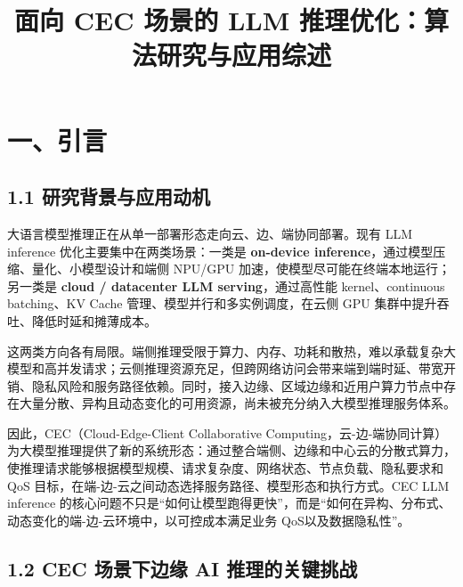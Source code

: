 \documentclass[a4paper,10pt]{ctexart}
\title{面向 CEC 场景的 LLM 推理优化：算法研究与应用综述}
\author{}
\date{}
\begin{document}
\maketitle
\tableofcontents
\vspace{0.8em}


\section*{一、引言}

\subsection*{1.1 研究背景与应用动机}

大语言模型推理正在从单一部署形态走向云、边、端协同部署。现有 LLM inference 优化主要集中在两类场景：一类是 \textbf{on-device inference}，通过模型压缩、量化、小模型设计和端侧 NPU/GPU 加速，使模型尽可能在终端本地运行；另一类是 \textbf{cloud / datacenter LLM serving}，通过高性能 kernel、continuous batching、KV Cache 管理、模型并行和多实例调度，在云侧 GPU 集群中提升吞吐、降低时延和摊薄成本。


这两类方向各有局限。端侧推理受限于算力、内存、功耗和散热，难以承载复杂大模型和高并发请求；云侧推理资源充足，但跨网络访问会带来端到端时延、带宽开销、隐私风险和服务路径依赖。同时，接入边缘、区域边缘和近用户算力节点中存在大量分散、异构且动态变化的可用资源，尚未被充分纳入大模型推理服务体系。


因此，CEC（Cloud-Edge-Client Collaborative Computing，云-边-端协同计算）为大模型推理提供了新的系统形态：通过整合端侧、边缘和中心云的分散式算力，使推理请求能够根据模型规模、请求复杂度、网络状态、节点负载、隐私要求和 QoS 目标，在端-边-云之间动态选择服务路径、模型形态和执行方式。CEC LLM inference 的核心问题不只是“如何让模型跑得更快”，而是“如何在异构、分布式、动态变化的端-边-云环境中，以可控成本满足业务 QoS以及数据隐私性”。




\subsection*{1.2 CEC 场景下边缘 AI 推理的关键挑战}
\end{document}
